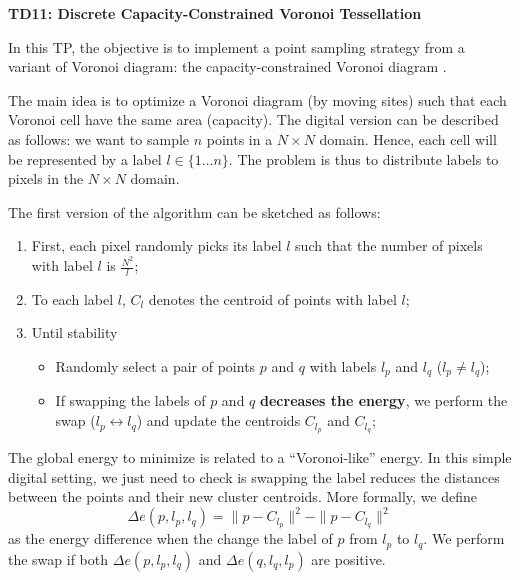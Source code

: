 \documentclass[a4paper, 11pt]{article}
\title{}
\author{}
\date{}
\begin{document}
\begin{center}
	\LARGE \textbf{TD11: Discrete Capacity-Constrained Voronoi Tessellation}
\end{center}

\bigskip
\par In this TP, the objective is to implement a point sampling
strategy from a variant of Voronoi diagram: the capacity-constrained
Voronoi diagram
\cite{BalzerHeck:2008:CCVDIFS,Balzer.etal:2009:CCPDAVoLM}.

The main idea is to optimize a Voronoi diagram (by moving sites) such
that each Voronoi cell have the same area (capacity).  The digital
version can be described as follows: we want to sample $n$ points in a
$N\times N$ domain. Hence, each cell will be represented by a label
$l\in\{1\ldots n\}$. The problem is thus to distribute labels to
pixels in the $N\times N$ domain.

The first version of the algorithm can be sketched as follows:

\begin{enumerate}
\item First, each pixel randomly picks its label $l$ such that the
  number of pixels with label $l$ is  $\frac{N^2}{l}$;
\item To each label $l$, $C_l$ denotes the centroid of points with
  label $l$;

\item Until stability
  \begin{itemize}
  \item Randomly select a pair of points $p$ and $q$ with
    labels $l_p$ and $l_q$ ($l_p\neq l_q$);
  \item If swapping the labels of $p$ and $q$ \textbf{decreases the
    energy}, we perform the swap  ($l_p\leftrightarrow l_q$) and
    update the centroids $C_{l_p}$ and $C_{l_q}$;
  \end{itemize}
\end{enumerate}

The global energy to minimize is related to a ``Voronoi-like''
energy. In this simple digital setting, we just need to check is
swapping the label reduces the distances between the points and their
new cluster centroids.
More formally, we define
\begin{displaymath}
  \Delta e(p,l_p,l_q) = \|p-C_{l_p}\|^2 - \|p-C_{l_q}\|^2
\end{displaymath}
as the energy difference when the change the label of $p$ from $l_p$
to $l_q$. We perform the swap if both $\Delta e(p,l_p,l_q)$ and $\Delta
e(q,l_q,l_p)$ are positive.
\end{document}
